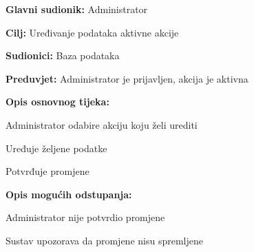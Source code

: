 					\noindent {}
					\begin{packed_item}
						
						\item \textbf{Glavni sudionik: }Administrator
						\item  \textbf{Cilj:} Uređivanje podataka aktivne akcije
						\item  \textbf{Sudionici:} Baza podataka
						\item  \textbf{Preduvjet:} Administrator je prijavljen, akcija je aktivna
						\item  \textbf{Opis osnovnog tijeka:}
						
						\item[] \begin{packed_enum}
							
							\item Administrator odabire akciju koju želi urediti
							\item Uređuje željene podatke
							\item Potvrđuje promjene
						\end{packed_enum}
						
						\item  \textbf{Opis mogućih odstupanja:}
						
						\item[] \begin{packed_item}
							
							\item[3.a] Administrator nije potvrdio promjene
							\item[] \begin{packed_enum}
								
								\item Sustav upozorava da promjene nisu spremljene
								
							\end{packed_enum}		
							
						\end{packed_item}
					\end{packed_item}
					
